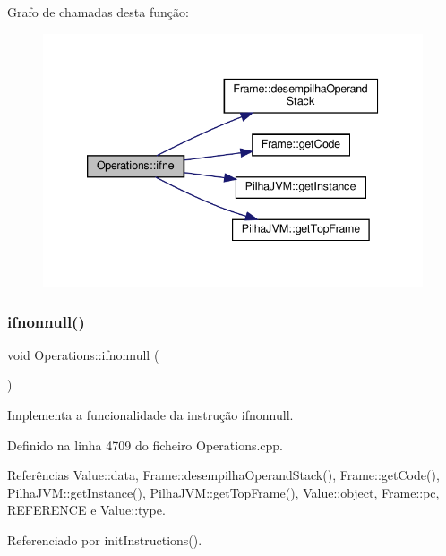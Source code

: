 Grafo de chamadas desta função\+:
\nopagebreak
\begin{figure}[H]
\begin{center}
\leavevmode
\includegraphics[width=339pt]{classOperations_aaadc2a6aaf1d3be06e918930622dad29_cgraph}
\end{center}
\end{figure}
\mbox{\label{classOperations_a00af7ab198690f5d3e6c7f2b2d374194}} 
\subsubsection{\texorpdfstring{ifnonnull()}{ifnonnull()}}
{\footnotesize\ttfamily void Operations\+::ifnonnull (\begin{DoxyParamCaption}{ }\end{DoxyParamCaption})\hspace{0.3cm}{\ttfamily [private]}}



Implementa a funcionalidade da instrução ifnonnull. 



Definido na linha 4709 do ficheiro Operations.\+cpp.



Referências Value\+::data, Frame\+::desempilha\+Operand\+Stack(), Frame\+::get\+Code(), Pilha\+J\+V\+M\+::get\+Instance(), Pilha\+J\+V\+M\+::get\+Top\+Frame(), Value\+::object, Frame\+::pc, R\+E\+F\+E\+R\+E\+N\+CE e Value\+::type.



Referenciado por init\+Instructions().

